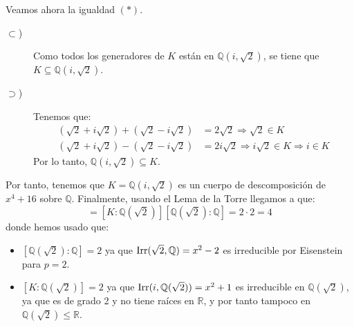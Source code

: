\begin{ejercicio}
    Veamos ahora la igualdad $(\ast)$.
    \begin{description}
        \item[$\subset$)] Como todos los generadores de $K$ están en $\mathbb{Q}(i,\sqrt{2})$, se tiene que $K\subseteq \mathbb{Q}(i,\sqrt{2})$.
        \item[$\supset$)] Tenemos que:
        \begin{align*}
            \left(\sqrt{2} + i\sqrt{2}\right) + \left(\sqrt{2} - i\sqrt{2}\right) &= 2\sqrt{2} \Longrightarrow \sqrt{2}\in K \\
            \left(\sqrt{2} + i\sqrt{2}\right) - \left(\sqrt{2} - i\sqrt{2}\right) &= 2i\sqrt{2} \Longrightarrow i\sqrt{2}\in K \Longrightarrow i\in K
        \end{align*}
        Por lo tanto, $\mathbb{Q}(i,\sqrt{2}) \subseteq K$.
    \end{description}

    Por tanto, tenemos que $K = \mathbb{Q}(i,\sqrt{2})$ es un cuerpo de descomposición de $x^4+16$ sobre $\mathbb{Q}$.    
    Finalmente, usando el Lema de la Torre llegamos a que:
    \begin{equation*}
        [K:\mathbb{Q}] = [K:\mathbb{Q}(\sqrt{2})][\mathbb{Q}(\sqrt{2}):\mathbb{Q}] = 2\cdot 2 = 4
    \end{equation*}
    donde hemos usado que:
    \begin{itemize}
        \item $[\mathbb{Q}(\sqrt{2}):\mathbb{Q}] = 2$ ya que $\operatorname{Irr}(\sqrt{2},\mathbb{Q}) = x^2-2$ es irreducible por Eisenstein para $p=2$.
        \item $[K:\mathbb{Q}(\sqrt{2})] = 2$ ya que $\operatorname{Irr}(i,\mathbb{Q}(\sqrt{2})) = x^2+1$ es irreducible en $\mathbb{Q}(\sqrt{2})$, ya que es de grado 2 y no tiene raíces en $\mathbb{R}$, y por tanto tampoco en $\mathbb{Q}(\sqrt{2})\leq \mathbb{R}$.
    \end{itemize}
\end{ejercicio}

